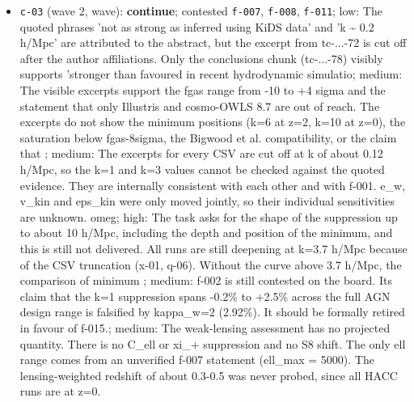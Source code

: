 \documentclass[11pt,a4paper]{article}
\begin{document}
\begin{itemize}
  \item \texttt{c-03} (wave 2, wave): \textbf{continue}; contested \texttt{f-007}, \texttt{f-008}, \texttt{f-011}; low: The quoted phrases 'not as strong as inferred using KiDS data' and 'k \textasciitilde{} 0.2 h/Mpc' are attributed to the abstract, but the excerpt from tc-...-72 is cut off after the author affiliations. Only the conclusions chunk (tc-...-78) visibly supports 'stronger than favoured in recent hydrodynamic simulatio; medium: The visible excerpts support the fgas range from -10 to +4 sigma and the statement that only Illustris and cosmo-OWLS 8.7 are out of reach. The excerpts do not show the minimum positions (k=6 at z=2, k=10 at z=0), the saturation below fgas-8sigma, the Bigwood et al. compatibility, or the claim that ; medium: The excerpts for every CSV are cut off at k of about 0.12 h/Mpc, so the k=1 and k=3 values cannot be checked against the quoted evidence. They are internally consistent with each other and with f-001. e\_w, v\_kin and eps\_kin were only moved jointly, so their individual sensitivities are unknown. omeg; high: The task asks for the shape of the suppression up to about 10 h/Mpc, including the depth and position of the minimum, and this is still not delivered. All runs are still deepening at k=3.7 h/Mpc because of the CSV truncation (x-01, q-06). Without the curve above 3.7 h/Mpc, the comparison of minimum ; medium: f-002 is still contested on the board. Its claim that the k=1 suppression spans -0.2\% to +2.5\% across the full AGN design range is falsified by kappa\_w=2 (2.92\%). It should be formally retired in favour of f-015.; medium: The weak-lensing assessment has no projected quantity. There is no C\_ell or xi\_+ suppression and no S8 shift. The only ell range comes from an unverified f-007 statement (ell\_max = 5000). The lensing-weighted redshift of about 0.3-0.5 was never probed, since all HACC runs are at z=0.

\end{itemize}
\end{document}
